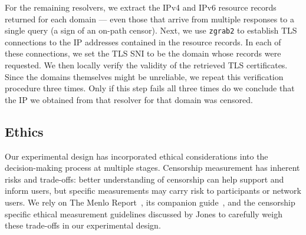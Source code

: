 For the remaining resolvers, we extract the IPv4 and IPv6 resource records
returned for each domain --- even those that arrive from multiple responses to
a single query (a sign of an on-path censor). Next, we use \texttt{zgrab2} to
establish TLS connections to the IP addresses contained in the resource
records. In each of these connections, we set the TLS SNI to be the domain
whose records were requested. We then locally verify the validity of the
retrieved TLS certificates.
%
Since the domains themselves might be unreliable, we repeat this verification
procedure three times. Only if this step fails all three times do we conclude
that the IP we obtained from that resolver for that domain was censored. 

\subsection{Ethics}\label{sec:methodology:ethics}
Our experimental design has incorporated ethical considerations into the
decision-making process at multiple stages.
Censorship measurement has inherent risks and trade-offs: better understanding
of censorship can help support and inform users, but specific measurements may
carry risk to participants or network users.
We rely on The Menlo Report~\cite{menlo}, its companion
guide~\cite{menlo-companion}, and the censorship specific ethical measurement
guidelines discussed by Jones \etal \cite{jones2015ethical} to 
carefully weigh these trade-offs in our experimental design.

